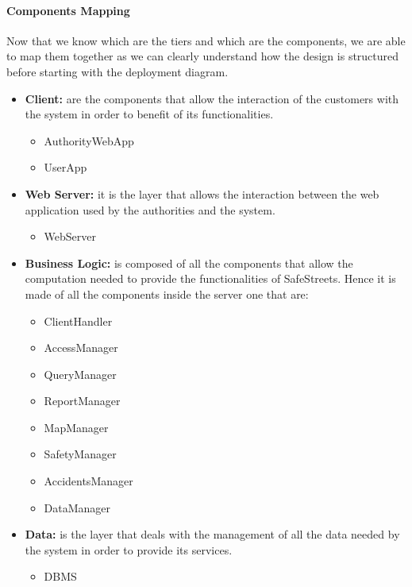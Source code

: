 		\paragraph{Components Mapping} Now that we know which are the tiers and which are the components, we are able to map them together as we can clearly understand how the design is structured before starting with the deployment diagram.
		
		\begin{itemize}
			\item \textbf{Client:} are the components that allow the interaction of the customers with the system in order to benefit of its functionalities.
			
				\begin{itemize}
					\item AuthorityWebApp
					\item UserApp
				\end{itemize}
			
			\item \textbf{Web Server:} it is the layer that allows the interaction between the web application used by the authorities and the system.
			
				\begin{itemize}
					\item WebServer
				\end{itemize}
			
			\item \textbf{Business Logic:} is composed of all the components that allow the computation needed to provide the functionalities of SafeStreets. Hence it is made of all the components inside the server one that are:
			
				\begin{itemize}
					\item ClientHandler
					\item AccessManager
					\item QueryManager
					\item ReportManager
					\item MapManager
					\item SafetyManager
					\item AccidentsManager
					\item DataManager
				\end{itemize}
			
			\item \textbf{Data:} is the layer that deals with the management of all the data needed by the system in order to provide its services.
			
				\begin{itemize}
					\item DBMS
				\end{itemize}
		\end{itemize}
	
